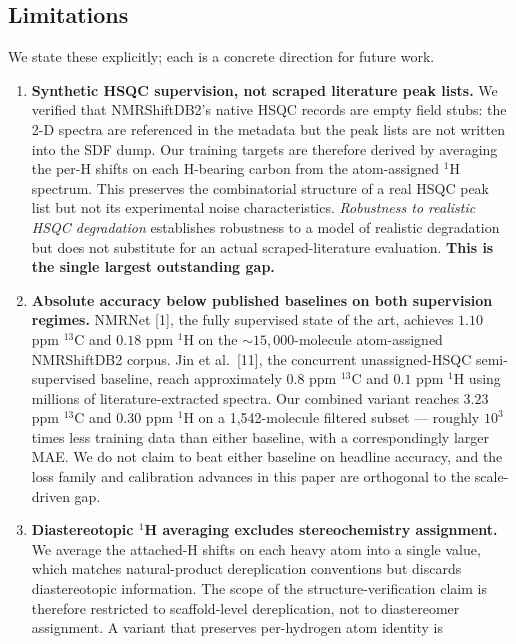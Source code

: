 \documentclass[
  11pt,
  a4paper,
]{article}
\begin{document}
\subsection*{Limitations}

We state these explicitly; each is a concrete direction for future work.

\begin{enumerate}
\def\labelenumi{\arabic{enumi}.}
\item
  \textbf{Synthetic HSQC supervision, not scraped literature peak lists.} We
  verified that NMRShiftDB2's native HSQC records are empty field
  stubs: the 2-D spectra are referenced in the metadata but the peak
  lists are not written into the SDF dump. Our training targets are
  therefore derived by averaging the per-H shifts on each H-bearing
  carbon from the atom-assigned \(^{1}\)H spectrum. This preserves the
  combinatorial structure of a real HSQC peak list but not its
  experimental noise characteristics. \emph{Robustness to realistic HSQC
  degradation} establishes
  robustness to a model of realistic degradation but does not
  substitute for an actual scraped-literature evaluation. \textbf{This is
  the single largest outstanding gap.}
\item
  \textbf{Absolute accuracy below published baselines on both
  supervision regimes.} NMRNet {[}1{]}, the fully supervised
  state of the art, achieves \(1.10\) ppm \(^{13}\)C and \(0.18\) ppm
  \(^{1}\)H on the \(\sim\!15{,}000\)-molecule atom-assigned NMRShiftDB2
  corpus. Jin et al.~{[}11{]}, the concurrent unassigned-HSQC
  semi-supervised baseline, reach approximately \(0.8\) ppm \(^{13}\)C
  and \(0.1\) ppm \(^{1}\)H using millions of literature-extracted
  spectra. Our combined variant reaches \(3.23\) ppm \(^{13}\)C and
  \(0.30\) ppm \(^{1}\)H on a 1,542-molecule filtered subset --- roughly
  \(10^{3}\) times less training data than either baseline, with a
  correspondingly larger MAE. We do not claim to beat either
  baseline on headline accuracy, and the loss family and
  calibration advances in this paper are orthogonal to the
  scale-driven gap.
\item
  \textbf{Diastereotopic \(^{1}\)H averaging excludes stereochemistry
  assignment.} We average the attached-H shifts on each heavy atom
  into a single value, which matches natural-product dereplication
  conventions but discards diastereotopic information. The scope of
  the structure-verification claim is therefore restricted to
  scaffold-level dereplication, not to diastereomer assignment. A
  variant that preserves per-hydrogen atom identity is

\end{enumerate}
\end{document}
